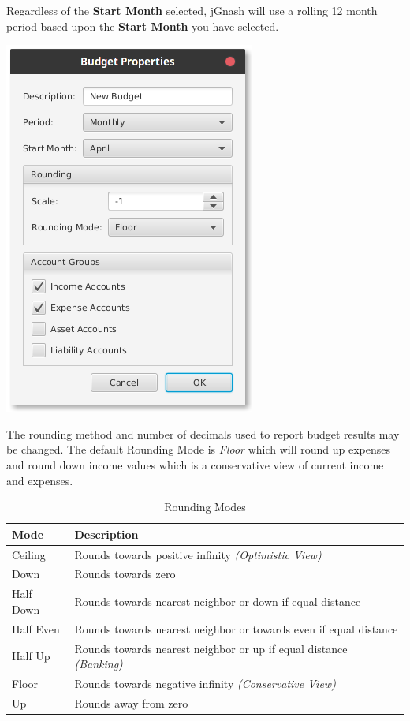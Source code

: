 \documentclass[letterpaper,12pt]{book}
\begin{document}
    Regardless of the \textbf{Start Month} selected, jGnash will use a rolling 12 month period based upon the \textbf{Start Month} you
    have selected.

    \includegraphics[width=0.5\linewidth]{images/budget-properties}

    The rounding method and number of decimals used to report budget results may be changed.
    The default Rounding Mode is \textit{Floor} which will round up expenses and round down income values which is a conservative
    view of current income and expenses.

    \begin{table}[H]
        \begin{tabular}{|l|l|}
            \hline
            \textbf{Mode} & \textbf{Description} \\
            \hline
            \hline
            Ceiling & Rounds towards positive infinity \textit{(Optimistic View)} \\
            \hline
            Down & Rounds towards zero \\
            \hline
            Half Down & Rounds towards nearest neighbor or down if equal distance \\
            \hline
            Half Even & Rounds towards nearest neighbor or towards even if equal distance \\
            \hline
            Half Up & Rounds towards nearest neighbor or up if equal distance \textit{(Banking)} \\
            \hline
            Floor & Rounds towards negative infinity \textit{(Conservative View)} \\
            \hline
            Up & Rounds away from zero \\
            \hline
        \end{tabular}
        \caption{Rounding Modes}
    \end{table}
\end{document}
